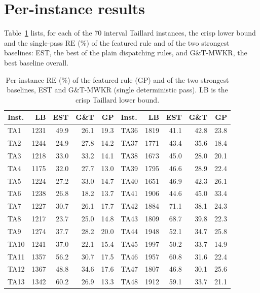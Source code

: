 \documentclass[11pt]{article}
\newcommand{\RE}{\mathrm{RE}}
\begin{document}
\section{Per-instance results}
\label{sec:perinstance}
Table~\ref{tab:perinstance} lists, for each of the 70 interval Taillard
instances, the crisp lower bound and the single-pass $\RE$ (\%) of the
featured rule and of the two strongest baselines: EST, the best of the
plain dispatching rules, and G\&T-MWKR, the best baseline overall.

\begin{table}[!htb]
\centering\scriptsize
\caption{Per-instance $\RE$ (\%) of the featured rule (GP) and of the two
strongest baselines, EST and G\&T-MWKR (single deterministic pass). LB is
the crisp Taillard lower bound.}
\label{tab:perinstance}
\renewcommand{\arraystretch}{0.92}
\setlength{\tabcolsep}{4pt}
\begin{tabular}{lrrrr@{\hskip 0.9em}|@{\hskip 0.9em}lrrrr}
\toprule
Inst. & LB & EST & G\&T & GP & Inst. & LB & EST & G\&T & GP \\
\midrule
TA1 & 1231 & 49.9 & 26.1 & 19.3 & TA36 & 1819 & 41.1 & 42.8 & 23.8 \\
TA2 & 1244 & 24.9 & 27.8 & 14.2 & TA37 & 1771 & 43.4 & 35.6 & 18.4 \\
TA3 & 1218 & 33.0 & 33.2 & 14.1 & TA38 & 1673 & 45.0 & 28.0 & 20.1 \\
TA4 & 1175 & 32.0 & 27.7 & 13.0 & TA39 & 1795 & 46.6 & 28.9 & 22.4 \\
TA5 & 1224 & 27.2 & 33.0 & 14.7 & TA40 & 1651 & 46.9 & 42.3 & 26.1 \\
TA6 & 1238 & 26.8 & 18.2 & 13.7 & TA41 & 1906 & 44.6 & 45.0 & 33.4 \\
TA7 & 1227 & 30.7 & 26.1 & 17.7 & TA42 & 1884 & 71.1 & 38.1 & 24.3 \\
TA8 & 1217 & 23.7 & 25.0 & 14.8 & TA43 & 1809 & 68.7 & 39.8 & 22.3 \\
TA9 & 1274 & 37.7 & 28.2 & 20.0 & TA44 & 1948 & 52.1 & 34.7 & 25.8 \\
TA10 & 1241 & 37.0 & 22.1 & 15.4 & TA45 & 1997 & 50.2 & 33.7 & 14.9 \\
TA11 & 1357 & 56.2 & 30.7 & 17.5 & TA46 & 1957 & 60.8 & 31.6 & 22.4 \\
TA12 & 1367 & 48.8 & 34.6 & 17.6 & TA47 & 1807 & 46.8 & 30.1 & 25.6 \\
TA13 & 1342 & 60.2 & 26.9 & 13.3 & TA48 & 1912 & 59.1 & 33.7 & 21.1 \\

\end{tabular}
\end{table}
\end{document}

